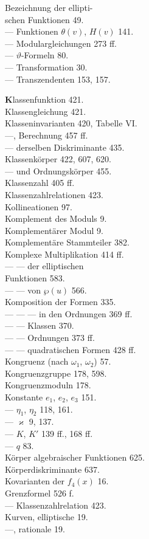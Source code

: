 
\noindent
\begin{minipage}[t]{0.48\textwidth}
\noindent {} Bezeichnung der ellipti-\\
schen Funktionen 49.\\
--- Funktionen $\theta(v)$, $H(v)$ 141.\\
--- Modulargleichungen 273 ff.\\
--- $\vartheta$-Formeln 80.\\
--- Transformation 30.\\
--- Transzendenten 153, 157.

\noindent \textbf{K}lassenfunktion 421.\\
Klassengleichung 421.\\
Klasseninvarianten 420, Tabelle VI.\\
---, Berechnung 457 ff.\\
--- derselben Diskriminante 435.\\
Klassenkörper 422, 607, 620.\\
--- und Ordnungskörper 455.\\
Klassenzahl 405 ff.\\
Klassenzahlrelationen 423.\\
Kollineationen 97.\\
Komplement des Moduls 9.\\
Komplementärer Modul 9.\\
Komplementäre Stammteiler 382.\\
Komplexe Multiplikation 414 ff.\\
--- --- der  elliptischen\\
Funktionen 583.\\
--- --- von $\wp(u)$ 566.\\
Komposition der Formen 335.\\
--- --- --- in den Ordnungen 369 ff.\\
--- --- Klassen 370.\\
--- --- Ordnungen 373 ff.\\
--- --- quadratischen Formen 428 ff.\\
Kongruenz (nach $\omega_1$, $\omega_2$) 57.\\
Kongruenzgruppe 178, 598.\\
Kongruenzmoduln 178.\\
Konstante $e_1$, $e_2$, $e_3$ 151.\\
--- $\eta_1$, $\eta_2$ 118, 161.\\
--- $\varkappa$ 9, 137.\\
--- $K$, $K'$ 139 ff., 168 ff.\\
--- $q$ 83.\\
Körper algebraischer Funktionen 625.\\
Körperdiskriminante 637.\\
Kovarianten der $f_4(x)$ 16.\\
 Grenzformel 526 f.\\
--- Klassenzahlrelation 423.\\
Kurven, elliptische 19.\\
---, rationale 19.


\end{minipage}
